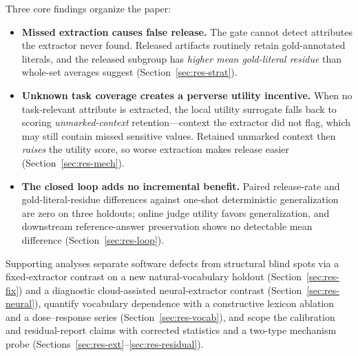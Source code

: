 \documentclass[journal]{IEEEtran}
\begin{document}
Three core findings organize the paper:
\begin{itemize}
\item \textbf{Missed extraction causes false release.} The gate cannot detect attributes the extractor never found. Released artifacts routinely retain gold-annotated literals, and the released subgroup has \emph{higher mean gold-literal residue} than whole-set averages suggest (Section~\ref{sec:res-strat}).
\item \textbf{Unknown task coverage creates a perverse utility incentive.} When no task-relevant attribute is extracted, the local utility surrogate falls back to scoring \emph{unmarked-context} retention---context the extractor did not flag, which may still contain missed sensitive values. Retained unmarked context then \emph{raises} the utility score, so worse extraction makes release easier (Section~\ref{sec:res-mech}).
\item \textbf{The closed loop adds no incremental benefit.} Paired release-rate and gold-literal-residue differences against one-shot deterministic generalization are zero on three holdouts; online judge utility favors generalization, and downstream reference-answer preservation shows no detectable mean difference (Section~\ref{sec:res-loop}).
\end{itemize}
Supporting analyses separate software defects from structural blind spots via a fixed-extractor contrast on a new natural-vocabulary holdout (Section~\ref{sec:res-fix}) and a diagnostic cloud-assisted neural-extractor contrast (Section~\ref{sec:res-neural}), quantify vocabulary dependence with a constructive lexicon ablation and a dose--response series (Section~\ref{sec:res-vocab}), and scope the calibration and residual-report claims with corrected statistics and a two-type mechanism probe (Sections~\ref{sec:res-ext}--\ref{sec:res-residual}).
\end{document}
